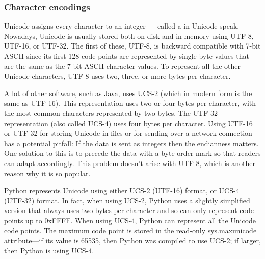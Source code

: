 \subsubsection{Character encodings}

Unicode assigns every character to an integer --- called a  in Unicode-speak.
Nowadays, Unicode is usually stored both on disk and in memory using UTF-8, UTF-16, or UTF-32.
The first of these, UTF-8, is backward compatible with 7-bit ASCII since its first 128 code points are represented by single-byte values that are the same as the 7-bit ASCII character values.
To represent all the other Unicode characters, UTF-8 uses two, three, or more bytes per character.


A lot of other software, such as Java, uses UCS-2 (which in modern form is the same as UTF-16).
This representation uses two or four bytes per character, with the most common characters represented by two bytes.
The UTF-32 representation (also called UCS-4) uses four bytes per character.
Using UTF-16 or UTF-32 for storing Unicode in files or for sending over a network connection has a potential pitfall: If the data is sent as integers then the endianness matters.
One solution to this is to precede the data with a byte order mark so that readers can adapt accordingly.
This problem doesn’t arise with UTF-8, which is another reason why it is so popular.


Python represents Unicode using either UCS-2 (UTF-16) format, or UCS-4 (UTF-32) format.
In fact, when using UCS-2, Python uses a slightly simplified version that always uses two bytes per character and so can only represent code points up to 0xFFFF.
When using UCS-4, Python can represent all the Unicode code points.
The maximum code point is stored in the read-only sys.maxunicode attribute—if its value is 65535, then Python was compiled to use UCS-2; if larger, then Python is using UCS-4.


